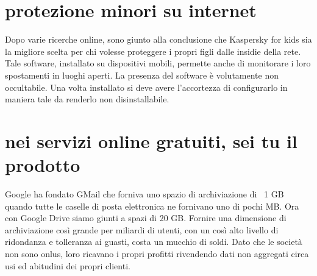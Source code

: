 \documentclass[italian,a4paper,12pt,oneside]{report}
\begin{document}
\section{protezione minori su internet}
Dopo varie ricerche online, sono giunto alla conclusione che Kaspersky for kids
sia la migliore scelta per chi volesse proteggere i propri figli dalle insidie
della rete. Tale software, installato su dispositivi mobili, permette anche di
monitorare i loro spostamenti in luoghi aperti. La presenza del software è
volutamente non occultabile. Una volta installato si deve avere l'accortezza
di configurarlo in maniera tale da renderlo non disinstallabile.

\section{nei servizi online gratuiti, sei tu il prodotto}
Google ha fondato GMail che forniva uno spazio di archiviazione di ~1 GB
quando tutte le caselle di posta elettronica ne fornivano uno di pochi MB.
Ora con Google Drive siamo giunti a spazi di 20 GB. Fornire una dimensione
di archiviazione così grande per miliardi di utenti, con un così alto
livello di ridondanza e tolleranza ai guasti, costa un mucchio di soldi.
Dato che le società non sono onlus, loro ricavano i propri profitti rivendendo
dati non aggregati circa usi ed abitudini dei propri clienti.
\end{document}
